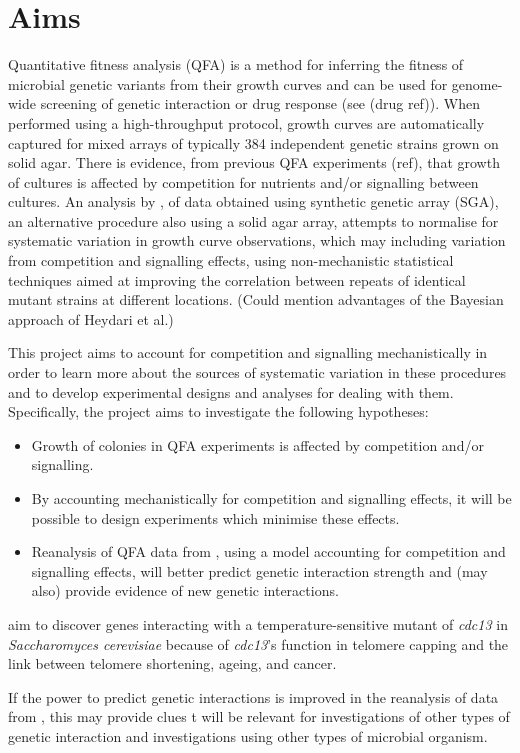 
\section{Aims}
\label{sec:aims}


Quantitative fitness analysis (QFA) is a method for inferring the
fitness of microbial genetic variants from their growth curves and can be
used for genome-wide screening of genetic interaction or drug response
(see \citet{Addinall2008,Addinall2011,Lawless2010,Banks2012} (drug
ref)). When performed using a high-throughput protocol, growth curves are
automatically captured for mixed arrays of typically 384 independent
genetic strains grown on solid agar. There is evidence, from previous
QFA experiments (ref), that growth of cultures is affected by
competition for nutrients and/or signalling between cultures.
An analysis by \citet{Baryshnikova2010}, of data obtained using synthetic
genetic array (SGA), an alternative procedure also using a solid
agar array, attempts to normalise for systematic variation in growth
curve observations, which may including variation from competition and
signalling effects, using non-mechanistic statistical techniques aimed
at improving the correlation between repeats of identical mutant
strains at different locations. (Could mention advantages
of the Bayesian approach of Heydari et al.)

This project aims to account for competition and signalling
mechanistically in order to learn more about the sources of systematic
variation in these procedures and to develop experimental designs and
analyses for dealing with them. Specifically, the project aims to
investigate the following hypotheses:
\begin{itemize}
\item Growth of colonies in QFA experiments is affected by competition
  and/or signalling.
\item By accounting mechanistically for competition and signalling effects, it
  will be possible to design experiments which minimise these effects.
\item Reanalysis of QFA data from \citet{Addinall2011}, using a model accounting for
  competition and signalling effects, will better predict genetic interaction
  strength and (may also) provide evidence of new genetic interactions.
\end{itemize}


\citet{Addinall2011} aim to discover genes interacting with a
temperature-sensitive mutant of \textit{cdc13} in
\textit{Saccharomyces cerevisiae} because of \textit{cdc13}'s function in telomere
capping and the link between telomere shortening, ageing, and cancer.


If the power to predict genetic interactions is improved in the
reanalysis of data from \citet{Addinall2011}, this may provide clues
t will be
relevant for investigations of other types of genetic interaction and
investigations using other types of microbial organism.


